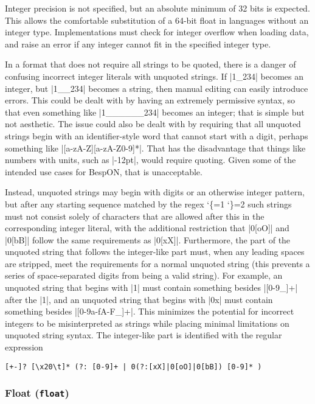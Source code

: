 \documentclass[11pt]{article}
\makeatletter
\newcommand{\bespon}{BespON}
\newcommand{\lit}{%
  \begingroup
  \let\do\@makeother
  \dospecials
  \catcode`\{=1
  \catcode`\}=2
  \lit@i}
\def\lit@i#1{%
  \endgroup
  \texttt{\color{DarkRed}\detokenize{#1}}}
\makeatother
\begin{document}
Integer precision is not specified, but an absolute minimum of 32 bits is expected.  This allows the comfortable substitution of a 64-bit float in languages without an integer type.  Implementations must check for integer overflow when loading data, and raise an error if any integer cannot fit in the specified integer type.

In a format that does not require all strings to be quoted, there is a danger of confusing incorrect integer literals with unquoted strings.  If |1_234| becomes an integer, but |1__234| becomes a string, then manual editing can easily introduce errors.  This could be dealt with by having an extremely permissive syntax, so that even something like |1______234| becomes an integer; that is simple but not aesthetic.  The issue could also be dealt with by requiring that all unquoted strings begin with an identifier-style word that cannot start with a digit, perhaps something like |[a-zA-Z][a-zA-Z0-9]*|.  That has the disadvantage that things like numbers with units, such as |-12pt|, would require quoting.  Given some of the intended use cases for \bespon, that is unacceptable.

Instead, unquoted strings may begin with digits or an otherwise integer pattern, but after any starting sequence matched by the regex \lit{[+-]?[\x20\t]*(?:[0-9]|0[xX]|0[oO]|0[bB])} such strings must not consist solely of characters that are allowed after this in the corresponding integer literal, with the additional restriction that |0[oO]| and |0[bB]| follow the same requirements as |0[xX]|.  Furthermore, the part of the unquoted string that follows the integer-like part must, when any leading spaces are stripped, meet the requirements for a normal unquoted string (this prevents a series of space-separated digits from being a valid string).  For example, an unquoted string that begins with |1| must contain something besides |[0-9_]+| after the |1|, and an unquoted string that begins with |0x| must contain something besides |[0-9a-fA-F_]+|.  This minimizes the potential for incorrect integers to be misinterpreted as strings while placing minimal limitations on unquoted string syntax.  The integer-like part is identified with the regular expression
\begin{Verbatim}
[+-]? [\x20\t]* (?: [0-9]+ | 0(?:[xX]|0[oO]|0[bB]) [0-9]* )
\end{Verbatim}


\subsubsection{Float (\texttt{float})}
\end{document}
